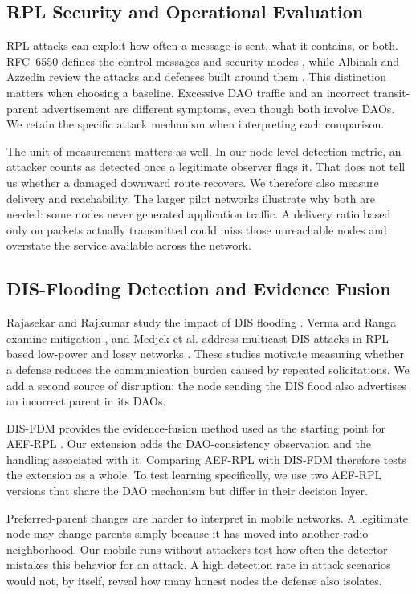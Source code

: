 \documentclass[journal]{IEEEtran}
\begin{document}
\subsection{RPL Security and Operational Evaluation}
RPL attacks can exploit how often a message is sent, what it contains, or both. RFC~6550 defines the control messages and security modes \cite{rfc6550}, while Albinali and Azzedin review the attacks and defenses built around them \cite{albinali2024}. This distinction matters when choosing a baseline. Excessive DAO traffic and an incorrect transit-parent advertisement are different symptoms, even though both involve DAOs. We retain the specific attack mechanism when interpreting each comparison.

The unit of measurement matters as well. In our node-level detection metric, an attacker counts as detected once a legitimate observer flags it. That does not tell us whether a damaged downward route recovers. We therefore also measure delivery and reachability. The larger pilot networks illustrate why both are needed: some nodes never generated application traffic. A delivery ratio based only on packets actually transmitted could miss those unreachable nodes and overstate the service available across the network.

\subsection{DIS-Flooding Detection and Evidence Fusion}
Rajasekar and Rajkumar study the impact of DIS flooding \cite{rajasekar2022}. Verma and Ranga examine mitigation \cite{vermaranga2020}, and Medjek et al. address multicast DIS attacks in RPL-based low-power and lossy networks \cite{medjek2021}. These studies motivate measuring whether a defense reduces the communication burden caused by repeated solicitations. We add a second source of disruption: the node sending the DIS flood also advertises an incorrect parent in its DAOs.

DIS-FDM provides the evidence-fusion method used as the starting point for AEF-RPL \cite{prajisha2025}. Our extension adds the DAO-consistency observation and the handling associated with it. Comparing AEF-RPL with DIS-FDM therefore tests the extension as a whole. To test learning specifically, we use two AEF-RPL versions that share the DAO mechanism but differ in their decision layer.

Preferred-parent changes are harder to interpret in mobile networks. A legitimate node may change parents simply because it has moved into another radio neighborhood. Our mobile runs without attackers test how often the detector mistakes this behavior for an attack. A high detection rate in attack scenarios would not, by itself, reveal how many honest nodes the defense also isolates.
\end{document}
